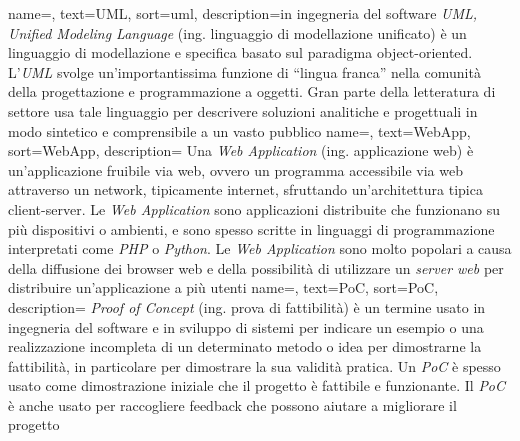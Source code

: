  {
    name=,
    text=UML,
    sort=uml,
    description={in ingegneria del software \emph{UML, Unified Modeling Language} (ing. linguaggio di modellazione unificato) è un linguaggio di modellazione e specifica basato sul paradigma object-oriented. L'\emph{UML} svolge un'importantissima funzione di ``lingua franca'' nella comunità della progettazione e programmazione a oggetti. Gran parte della letteratura di settore usa tale linguaggio per descrivere soluzioni analitiche e progettuali in modo sintetico e comprensibile a un vasto pubblico}
}
 {
    name=,
    text=WebApp,
    sort=WebApp,
    description={
        Una \emph{Web Application} (ing. applicazione web) è un'applicazione fruibile via web, ovvero un programma accessibile via web attraverso un network, tipicamente internet, sfruttando un'architettura tipica client-server. Le \emph{Web Application} sono applicazioni distribuite che funzionano su più dispositivi o ambienti, e sono spesso scritte in linguaggi di programmazione interpretati come \emph{PHP} o \emph{Python}. Le \emph{Web Application} sono molto popolari a causa della diffusione dei browser web e della possibilità di utilizzare un \emph{server web} per distribuire un'applicazione a più utenti
    }
}
 {
    name=,
    text=PoC,
    sort=PoC,
    description={
        \emph{Proof of Concept} (ing. prova di fattibilità) è un termine usato in ingegneria del software e in sviluppo di sistemi per indicare un esempio o una realizzazione incompleta di un determinato metodo o idea per dimostrarne la fattibilità, in particolare per dimostrare la sua validità pratica. Un \emph{PoC} è spesso usato come dimostrazione iniziale che il progetto è fattibile e funzionante. Il \emph{PoC} è anche usato per raccogliere feedback che possono aiutare a migliorare il progetto
        }
    }

